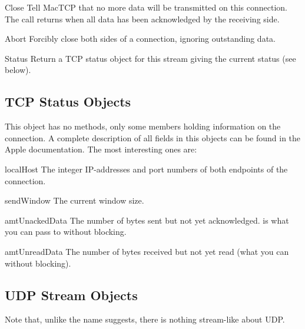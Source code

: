 \begin{funcdesc}{Close}{}
Tell MacTCP that no more data will be transmitted on this
connection. The call returns when all data has been acknowledged by
the receiving side.
\end{funcdesc}

\begin{funcdesc}{Abort}{}
Forcibly close both sides of a connection, ignoring outstanding data.
\end{funcdesc}

\begin{funcdesc}{Status}{}
Return a TCP status object for this stream giving the current status
(see below).
\end{funcdesc}

\subsection{TCP Status Objects}
This object has no methods, only some members holding information on
the connection. A complete description of all fields in this objects
can be found in the Apple documentation. The most interesting ones are:

\renewcommand{\indexsubitem}{(TCP status attribute)}

\begin{datadesc}{localHost}
The integer IP-addresses and port numbers of both endpoints of the
connection. 
\end{datadesc}

\begin{datadesc}{sendWindow}
The current window size.
\end{datadesc}

\begin{datadesc}{amtUnackedData}
The number of bytes sent but not yet acknowledged.  is what you can pass to  without blocking.
\end{datadesc}

\begin{datadesc}{amtUnreadData}
The number of bytes received but not yet read (what you can 
without blocking).
\end{datadesc}



\subsection{UDP Stream Objects}
Note that, unlike the name suggests, there is nothing stream-like
about UDP.

